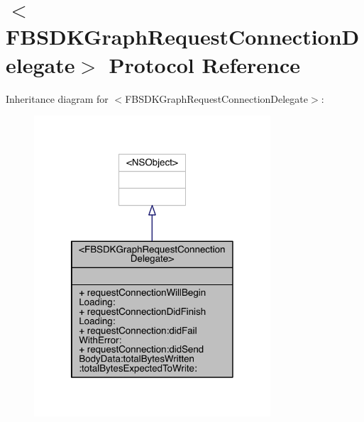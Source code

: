 \hypertarget{protocol_f_b_s_d_k_graph_request_connection_delegate-p}{\section{$<$F\-B\-S\-D\-K\-Graph\-Request\-Connection\-Delegate$>$ Protocol Reference}
\label{protocol_f_b_s_d_k_graph_request_connection_delegate-p}
}


Inheritance diagram for $<$F\-B\-S\-D\-K\-Graph\-Request\-Connection\-Delegate$>$\-:
\nopagebreak
\begin{figure}[H]
\begin{center}
\leavevmode
\includegraphics[width=250pt]{protocol_f_b_s_d_k_graph_request_connection_delegate-p__inherit__graph}
\end{center}
\end{figure}


